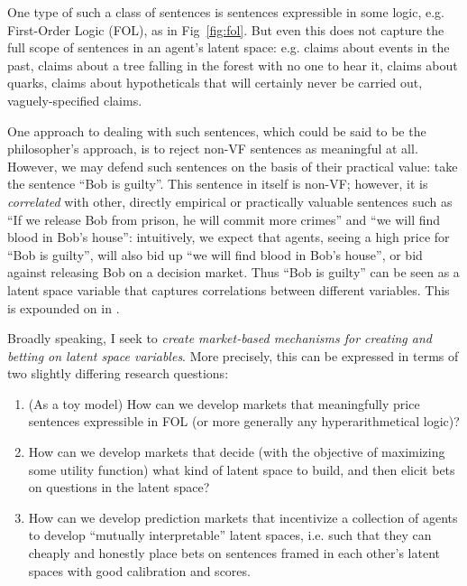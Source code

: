 \documentclass{article}
\begin{document}
One type of such a class of sentences is sentences expressible in some logic, e.g. First-Order Logic (FOL), as in Fig~\ref{fig:fol}. But even this does not capture the full scope of sentences in an agent's latent space: e.g. claims about events in the past, claims about a tree falling in the forest with no one to hear it, claims about quarks, claims about hypotheticals that will certainly never be carried out, vaguely-specified claims. 

One approach to dealing with such sentences, which could be said to be the philosopher's approach, is to reject non-VF sentences as meaningful at all. However, we may defend such sentences on the basis of their practical value: take the sentence ``Bob is guilty''. This sentence in itself is non-VF; however, it is \emph{correlated} with other, directly empirical or practically valuable sentences such as ``If we release Bob from prison, he will commit more crimes'' and ``we will find blood in Bob's house'': intuitively, we expect that agents, seeing a high price for ``Bob is guilty'', will also bid up ``we will find blood in Bob's house'', or bid against releasing Bob on a decision market. Thus ``Bob is guilty'' can be seen as a latent space variable that captures correlations between different variables. This is expounded on in \cite{tailcalledLatentVariablesPrediction2023}.

\begin{goals*}
    Broadly speaking, I seek to \emph{create market-based mechanisms for creating and betting on latent space variables}. More precisely, this can be expressed in terms of two slightly differing research questions:
    \begin{enumerate}
        \item (As a toy model) How can we develop markets that meaningfully price sentences expressible in FOL (or more generally any hyperarithmetical logic)? 
        \item How can we develop markets that decide (with the objective of maximizing some utility function) what kind of latent space to build, and then elicit bets on questions in the latent space?
        \item How can we develop prediction markets that incentivize a collection of agents to develop ``mutually interpretable'' latent spaces, i.e. such that they can cheaply and honestly place bets on sentences framed in each other's latent spaces with good calibration and scores.
    \end{enumerate}
\end{goals*} 
\end{document}
